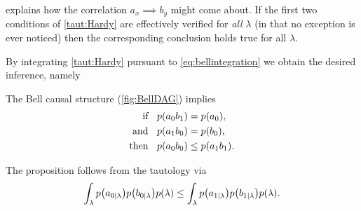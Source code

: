 \begin{EDITING...}
\noindent explains how the correlation $a_x {\scriptstyle \implies} b_y$ might come about. If the first two conditions of  \cref{taut:Hardy} are effectively verified for \emph{all} $\lambda$ (in that no exception is ever noticed) then the corresponding conclusion holds true for all $\lambda$. 

By integrating \cref{taut:Hardy} pursuant to \cref{eq:bellintegration} we obtain the desired inference, namely







\begin{prop} \label{prop:BellNoGo}
The Bell causal structure (\cref{fig:BellDAG}) implies
\begin{align*}
\text{if  }\;\; \p{a_0 b_1}&=\p{a_0},\\
\text{and }\;\; \p{a_1 b_0}&=\p{b_0},\\
\text{then }\;\; \p{a_0 b_0}&\leq \p{a_1 b_1}.
\end{align*}
\end{prop}

The proposition follows from the tautology via
\begin{align}
\int_{\lambda}\p{a_{0|\lambda}}\p{b_{0|\lambda}}\p{\lambda} \leq \int_{\lambda}\p{a_{1|\lambda}}\p{b_{1|\lambda}}\p{\lambda}.
\end{align}



\end{EDITING...}
